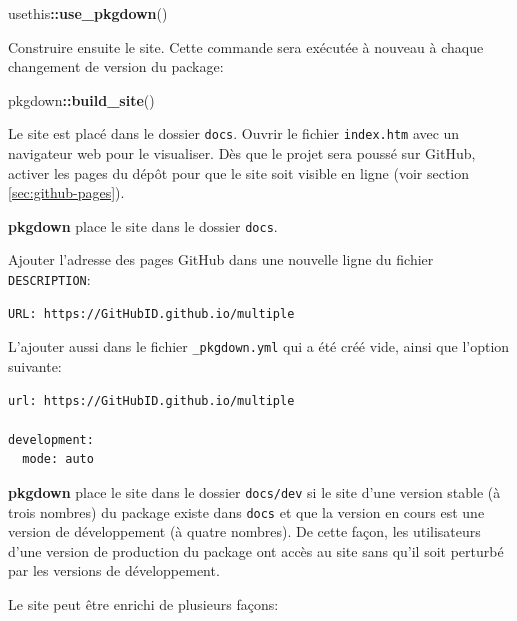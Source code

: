 \documentclass[
  12pt,
  french,
  a4paper,
  extrafontsizes,onecolumn,openright
  ]{memoir}
\newenvironment{Shaded}{\begin{snugshade}}{\end{snugshade}}
\newcommand{\FunctionTok}[1]{\textcolor[rgb]{0.13,0.29,0.53}{\textbf{#1}}}
\newcommand{\NormalTok}[1]{#1}
\newcommand{\SpecialCharTok}[1]{\textcolor[rgb]{0.81,0.36,0.00}{\textbf{#1}}}
\begin{document}
\begin{Shaded}
\begin{Highlighting}[]
\NormalTok{usethis}\SpecialCharTok{::}\FunctionTok{use\_pkgdown}\NormalTok{()}
\end{Highlighting}
\end{Shaded}

\normalsize

Construire ensuite le site.
Cette commande sera exécutée à nouveau à chaque changement de version du package:

\scriptsize

\begin{Shaded}
\begin{Highlighting}[]
\NormalTok{pkgdown}\SpecialCharTok{::}\FunctionTok{build\_site}\NormalTok{()}
\end{Highlighting}
\end{Shaded}

\normalsize

Le site est placé dans le dossier \texttt{docs}.
Ouvrir le fichier \texttt{index.htm} avec un navigateur web pour le visualiser.
Dès que le projet sera poussé sur GitHub, activer les pages du dépôt pour que le site soit visible en ligne (voir section \ref{sec:github-pages}).

\textbf{pkgdown} place le site dans le dossier \texttt{docs}.

Ajouter l'adresse des pages GitHub dans une nouvelle ligne du fichier \texttt{DESCRIPTION}:

\begin{verbatim}
URL: https://GitHubID.github.io/multiple
\end{verbatim}

L'ajouter aussi dans le fichier \texttt{\_pkgdown.yml} qui a été créé vide, ainsi que l'option suivante:

\begin{verbatim}
url: https://GitHubID.github.io/multiple

development:
  mode: auto
\end{verbatim}

\textbf{pkgdown} place le site dans le dossier \texttt{docs/dev} si le site d'une version stable (à trois nombres) du package existe dans \texttt{docs} et que la version en cours est une version de développement (à quatre nombres).
De cette façon, les utilisateurs d'une version de production du package ont accès au site sans qu'il soit perturbé par les versions de développement.

Le site peut être enrichi de plusieurs façons:
\end{document}
